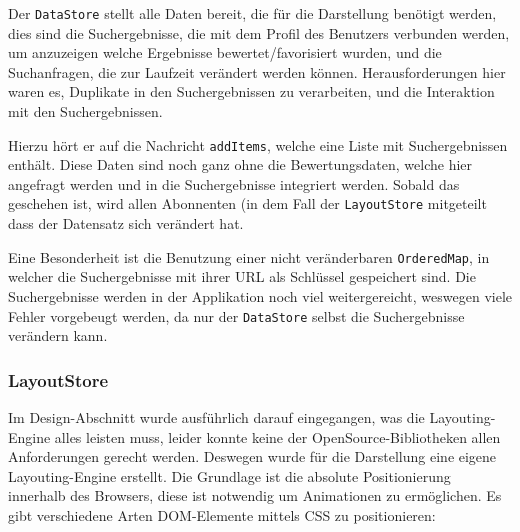 \documentclass[12pt,twoside]{book}
\begin{document}
Der \texttt{DataStore} stellt alle Daten bereit, die für die Darstellung benötigt werden, dies sind die Suchergebnisse, die mit dem Profil des Benutzers verbunden werden, um anzuzeigen welche Ergebnisse bewertet/favorisiert wurden, und die Suchanfragen, die zur Laufzeit verändert werden können. Herausforderungen hier waren es, Duplikate in den Suchergebnissen zu verarbeiten, und die Interaktion mit den Suchergebnissen.

Hierzu hört er auf die Nachricht \texttt{addItems}, welche eine Liste mit Suchergebnissen enthält. Diese Daten sind noch ganz ohne die Bewertungsdaten, welche hier angefragt werden und in die Suchergebnisse integriert werden. Sobald das geschehen ist, wird allen Abonnenten (in dem Fall der \texttt{LayoutStore} mitgeteilt dass der Datensatz sich verändert hat.

Eine Besonderheit ist die Benutzung einer nicht veränderbaren \texttt{OrderedMap}, in welcher die Suchergebnisse mit ihrer URL als Schlüssel gespeichert sind. Die Suchergebnisse werden in der Applikation noch viel weitergereicht, weswegen viele Fehler vorgebeugt werden, da nur der \texttt{DataStore} selbst die Suchergebnisse verändern kann.

\subsubsection*{LayoutStore}

Im Design-Abschnitt wurde ausführlich darauf eingegangen, was die Layouting-Engine alles leisten muss, leider konnte keine der OpenSource-Bibliotheken allen Anforderungen gerecht werden. Deswegen wurde für die Darstellung eine eigene Layouting-Engine erstellt.
Die Grundlage ist die absolute Positionierung innerhalb des Browsers, diese ist notwendig um Animationen zu ermöglichen. Es gibt verschiedene Arten DOM-Elemente mittels CSS zu positionieren:
\end{document}
